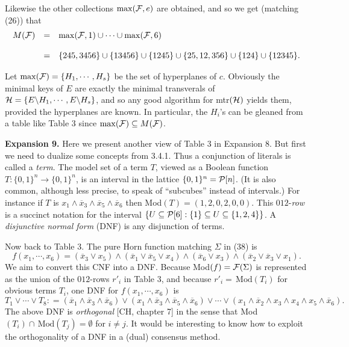 \documentclass[11pt]{article}
\newcommand{\ol}{\overline}
\newcommand{\ra}{\rightarrow}
\begin{document}
Likewise the other collections $\max ({\cal F}, e)$ are obtained, and so we get (matching (26)) that 
$$\begin{array}{lll}
M({\cal F}) & =& \max ({\cal F},1) \cup \cdots \cup \max ({\cal F}, 6)\\
\\
& =& \{245, 3456\} \cup \{13456\} \cup \{1245\} \cup \{25, 12, 356\} \cup \{124\} \cup \{12345\}. \end{array}$$

Let $\max ({\cal F}) = \{H_1, \cdots, H_s\}$ be the set of hyperplanes of $c$. Obviously the minimal keys of $E$ are exactly the minimal transverals of ${\cal H} = \{E \backslash H_1, \cdots, E \backslash H_s\}$, and so any good algorithm for mtr$({\cal H})$ yields them, provided the hyperplanes are known. In particular, the $H_i$'s can be gleaned from a table like Table 3 since $\max ({\cal F}) \subseteq M({\cal F})$.


{\bf Expansion 9.} Here we present another view of Table 3 in Expansion 8. But first we need to dualize some concepts from 3.4.1. 
Thus a conjunction of literals is called a {\it term}. The model set of a term $T$, viewed as a Boolean function $T: \{0,1\}^n \ra \{0,1\}^n$, is an interval in the lattice $\{0,1\}^n = {\cal P}[n]$. (It is also common, although less precise, to speak of ``subcubes'' instead of intervals.) For instance if $T$ is $x_1 \wedge \ol{x}_3 \wedge \ol{x}_5 \wedge \ol{x}_6$ then Mod$(T) = (1,2, 0, 2, 0,0)$. This $012$-{\it row} is a succinct notation for the interval  $\{U\subseteq {\cal P}[6] : \{1\} \subseteq U \subseteq \{1,2,4\}\}$.  A {\it disjunctive normal form} (DNF) is any disjunction of terms. 


Now back to Table 3. The pure Horn function matching $\Sigma$ in (38) is
$$f(x_1, \cdots, x_6) = (\ol{x}_3 \vee x_5) \wedge (\ol{x}_1 \vee \ol{x}_5 \vee x_4) \wedge (\ol{x}_6 \vee x_3) \wedge (\ol{x}_2 \vee \ol{x}_3 \vee x_1).$$
We aim to convert this CNF into a DNF. Because Mod$(f) = {\cal F}(\Sigma)$ is represented as the union of the $012$-rows $r'_i$ in Table 3, and because $r'_i = \, \mbox{Mod}(T_i)$ for obvious terms $T_i$, one DNF for $f(x_1, \cdots, x_6)$ is
$$T_1 \vee \cdots \vee T_8 : = (\ol{x}_1 \wedge \ol{x}_3 \wedge \ol{x}_6) \vee (x_1 \wedge \ol{x}_3 \wedge \ol{x}_5 \wedge \ol{x}_6) \vee \cdots \vee (x_1 \wedge \ol{x}_2 \wedge x_3 \wedge x_4 \wedge x_5 \wedge \ol{x}_6).$$
The above DNF is {\it orthogonal} [CH, chapter 7] in the sense that Mod$(T_i) \cap \, \mbox{Mod}(T_j)=\emptyset$ for $i \neq j$. It would be interesting to know how to exploit the orthogonality of a DNF in a (dual) consensus method.
\end{document}
